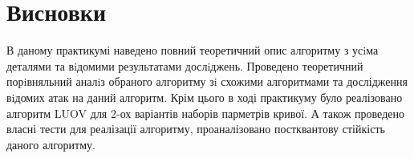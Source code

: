\newpage
\section{Висновки}

В даному практикумі наведено повний теоретичний опис алгоритму з усiма деталями та вiдомими результатами дослiджень. Проведено теоретичний порiвняльний аналiз обраного алгоритму зi схожими алгоритмами та дослідження вiдомих атак на даний алгоритм. Крім цього в ході практикуму було реалізовано алгоритм LUOV для 2-ох варіантів наборів парметрів кривої. А також проведено власні тести для реалізації алгоритму, проаналізовано постквантову стійкість даного алгоритму. 